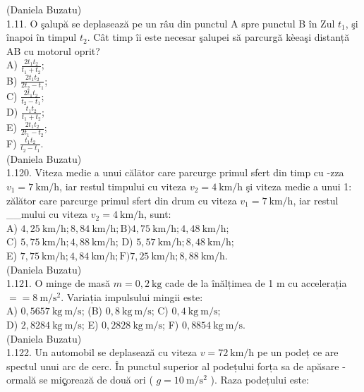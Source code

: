 \documentclass[10pt]{article}
\begin{document}
(Daniela Buzatu)\\
1.11. O şalupă se deplasează pe un râu din punctul A spre punctul B în Zul $t_{1}$, şi înapoi în timpul $t_{2}$. Cât timp îi este necesar şalupei să parcurgă kèeaşi distanță AB cu motorul oprit?\\
A) $\frac{2 t_{1} t_{2}}{t_{1}+t_{2}}$;\\
B) $\frac{2 t_{1} t_{2}}{2 t_{2}-t_{1}}$;\\
C) $\frac{2 t_{1} t_{2}}{t_{2}-t_{1}}$;\\
D) $\frac{t_{1} t_{2}}{t_{1}+t_{2}}$;\\
E) $\frac{2 t_{1} t_{2}}{2 t_{1}-t_{2}}$;\\
F) $\frac{t_{1} t_{2}}{t_{2}-t_{1}}$.\\
(Daniela Buzatu)\\
1.120. Viteza medie a unui călātor care parcurge primul sfert din timp cu -zza $v_{1}=7 \mathrm{~km} / \mathrm{h}$, iar restul timpului cu viteza $v_{2}=4 \mathrm{~km} / \mathrm{h}$ şi viteza medie a unui 1: zălător care parcurge primul sfert din drum cu viteza $v_{1}=7 \mathrm{~km} / \mathrm{h}$, iar restul \_\_mului cu viteza $v_{2}=4 \mathrm{~km} / \mathrm{h}$, sunt:\\
A) $4,25 \mathrm{~km} / \mathrm{h} ; 8,84 \mathrm{~km} / \mathrm{h} ; \mathrm{B}) 4,75 \mathrm{~km} / \mathrm{h} ; 4,48 \mathrm{~km} / \mathrm{h}$;\\
C) $5,75 \mathrm{~km} / \mathrm{h} ; 4,88 \mathrm{~km} / \mathrm{h}$; D) $5,57 \mathrm{~km} / \mathrm{h} ; 8,48 \mathrm{~km} / \mathrm{h}$;\\
E) $7,75 \mathrm{~km} / \mathrm{h} ; 4,84 \mathrm{~km} / \mathrm{h} ; \mathrm{F}) 7,25 \mathrm{~km} / \mathrm{h} ; 8,88 \mathrm{~km} / \mathrm{h}$.\\
(Daniela Buzatu)\\
1.121. O minge de masă $m=0,2 \mathrm{~kg}$ cade de la înălțimea de 1 m cu accelerația $==8 \mathrm{~m} / \mathrm{s}^{2}$. Variația impulsului mingii este:\\
A) $0,5657 \mathrm{~kg} \mathrm{~m} / \mathrm{s}$; (B) $0,8 \mathrm{~kg} \mathrm{~m} / \mathrm{s}$; C) $0,4 \mathrm{~kg} \mathrm{~m} / \mathrm{s}$;\\
D) $2,8284 \mathrm{~kg} \mathrm{~m} / \mathrm{s}$; E) $0,2828 \mathrm{~kg} \mathrm{~m} / \mathrm{s}$; F) $0,8854 \mathrm{~kg} \mathrm{~m} / \mathrm{s}$.\\
(Daniela Buzatu)\\
1.122. Un automobil se deplasează cu viteza $v=72 \mathrm{~km} / \mathrm{h}$ pe un podeț ce are spectul unui arc de cerc. În punctul superior al podețului forța sa de apăsare - ormală se miç̧orează de două ori ( $g=10 \mathrm{~m} / \mathrm{s}^{2}$ ). Raza podețului este:\\
\end{document}
